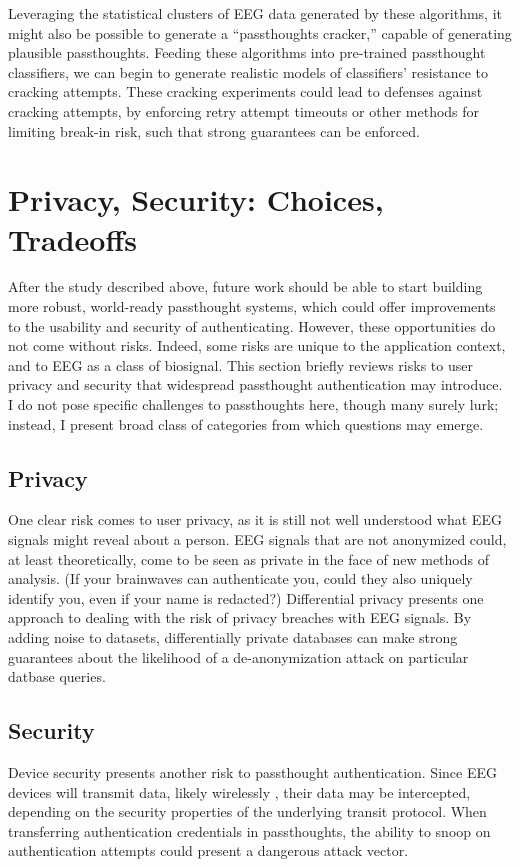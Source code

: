 \documentclass[sigconf]{acmart}
\begin{document}
Leveraging the statistical clusters of EEG data generated by these algorithms, it might also be possible to generate a ``passthoughts cracker,'' capable of generating plausible passthoughts. 
Feeding these algorithms into pre-trained passthought classifiers, we can begin to generate realistic models of classifiers' resistance to cracking attempts. 
These cracking experiments could lead to defenses against cracking attempts, by enforcing retry attempt timeouts or other methods for limiting break-in risk, such that strong guarantees can be enforced.

\section{Privacy, Security: Choices, Tradeoffs}
\label{sec:org02ed370}

After the study described above, future work should be able to start building more robust, world-ready passthought systems,
which could offer improvements to the usability and security of authenticating.
However, these opportunities do not come without risks. 
Indeed, some risks are unique to the application context, and to EEG as a class of biosignal. 
This section briefly reviews risks to user privacy and security that widespread passthought authentication may introduce. 
I do not pose specific challenges to passthoughts here, though many surely lurk; instead, I present broad class of categories from which questions may emerge. 

\subsection{Privacy}
\label{sec:org9297707}
One clear risk comes to user privacy, as it is still not well understood what EEG signals might reveal about a person.
EEG signals that are not anonymized could, at least theoretically, come to be seen as private in the face of new methods of analysis.
(If your brainwaves can authenticate you, could they also uniquely identify you, even if your name is redacted?)
Differential privacy \cite{Dwork2014} presents one approach to dealing with the risk of privacy breaches with EEG signals.
By adding noise to datasets, differentially private databases can make strong guarantees about the likelihood of a de-anonymization attack on particular datbase queries.

\subsection{Security}
\label{sec:orgfeb6760}
Device security presents another risk to passthought authentication.
Since EEG devices will transmit data, likely wirelessly \cite{Mihajlovic2015}, their data may be intercepted, depending on the security properties of the underlying transit protocol. 
When transferring authentication credentials in passthoughts, the ability to snoop on authentication attempts could present a dangerous attack vector.
\end{document}
